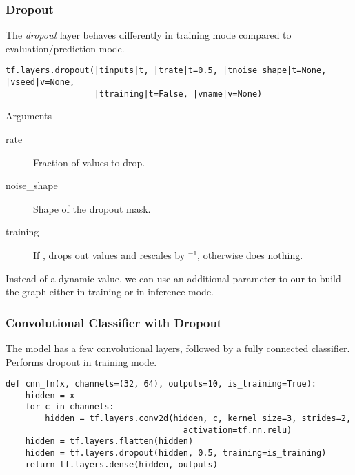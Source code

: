 \begin{frame}[fragile]
    \frametitle{Dropout}
    The \emph{dropout} layer behaves differently in training mode compared to evaluation/prediction mode.
    \begin{lstlisting}
tf.layers.dropout(|tinputs|t, |trate|t=0.5, |tnoise_shape|t=None, |vseed|v=None, 
                  |ttraining|t=False, |vname|v=None)

    \end{lstlisting}
    \begin{block}{Arguments}
        \begin{description}
        \item[rate] Fraction of values to drop.
        \item[noise\_shape] Shape of the dropout mask.
        \item[training] If , drops out  values and rescales by $^{-1}$, 
                        otherwise does nothing.
        \end{description}
    \end{block}
    Instead of a dynamic  value, we can use an additional parameter to our  
    to build the graph either in training or in inference mode. 
\end{frame}

\begin{frame}[fragile]
    \frametitle{Convolutional Classifier with Dropout}
    The model has a few convolutional layers, followed by a fully connected classifier. Performs dropout in training mode.
    \begin{lstlisting}
def cnn_fn(x, channels=(32, 64), outputs=10, is_training=True):
    hidden = x
    for c in channels:
        hidden = tf.layers.conv2d(hidden, c, kernel_size=3, strides=2,
                                    activation=tf.nn.relu)
    hidden = tf.layers.flatten(hidden)
    hidden = tf.layers.dropout(hidden, 0.5, training=is_training)
    return tf.layers.dense(hidden, outputs)
    \end{lstlisting}
\end{frame}
